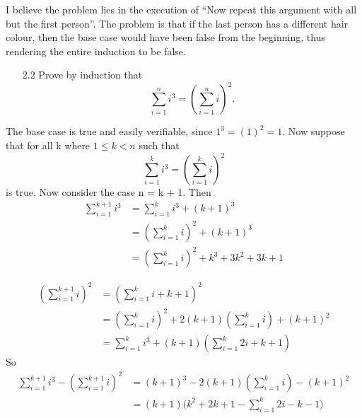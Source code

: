 \documentclass[11pt, oneside]{book}
\theoremstyle{break}
\begin{document}
I believe the problem lies in the execution of ``Now repeat this argument with all but the first person''. The problem is that if the last person has a different hair colour, then the base case would have been false from the beginning, thus rendering the entire induction to be false.

\begin{enumerate}
	\item[2.2] Prove by induction that
	\begin{equation*}
		\sum_{i=1}^{n} i^3 = \left(\sum_{i=1}^{n} i\right)^2.
	\end{equation*}
\end{enumerate}

The base case is true and easily verifiable, since $1^3 = (1)^2 = 1$. Now suppose that for all k where $1 \leq k < n$ such that
\begin{equation*}
	\sum_{i=1}^{k} i^3 = \left(\sum_{i=1}^{k} i \right)^2
\end{equation*}
is true. Now consider the case n = k + 1. Then
\begin{align*}
	\sum_{i = 1}^{k + 1} i^3
		&= \sum_{i=1}^{k} i^3 + (k + 1)^3 \\
		&= \left( \sum_{i=1}^{k} i \right)^2 + (k + 1)^3 \\
		&= \left( \sum_{i=1}^{k} i \right)^2 + k^3 + 3k^2 + 3k + 1
\end{align*}

\begin{align*}
	\left( \sum_{i=1}^{k + 1} i \right)^2
		&= \left( \sum_{i = 1}^{k} i + k + 1 \right)^2 \\
		&= \left( \sum_{i = 1}^{k} i \right)^2 + 2(k+1)\left( \sum_{i = 1}^{k} i \right) + (k + 1)^2 \\
		&= \sum_{i=1}^{k} i^3 + (k+1)\left(\sum_{i=1}^{k} 2i + k + 1 \right)
\end{align*}
So
\begin{align*}
	\sum_{i = 1}^{k + 1} i^3 - \left( \sum_{i=1}^{k + 1} i \right)^2
		&= (k + 1)^3 - 2(k+1)\left( \sum_{i = 1}^{k} i \right) - (k + 1)^2 \\
		&= (k + 1)\Bigg( k^2 + 2k + 1 - \sum_{i=1}^{k} 2i - k - 1 \Bigg)
\end{align*}
\end{document}
